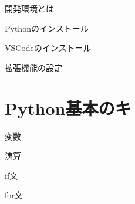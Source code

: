 \documentclass[dvipdfmx]{beamer}
\begin{document}
    \begin{frame}{開発環境とは}
        
    \end{frame}
    \begin{frame}{Pythonのインストール}
        
    \end{frame}
    \begin{frame}{VSCodeのインストール}
        
    \end{frame}
    \begin{frame}{拡張機能の設定}
        
    \end{frame}

\section{Python基本のキ}
    \begin{frame}{変数}
        
    \end{frame}
    \begin{frame}{演算}
        
    \end{frame}
    \begin{frame}{if文}

    \end{frame}
    \begin{frame}{for文}
        
    \end{frame}
\end{document}
